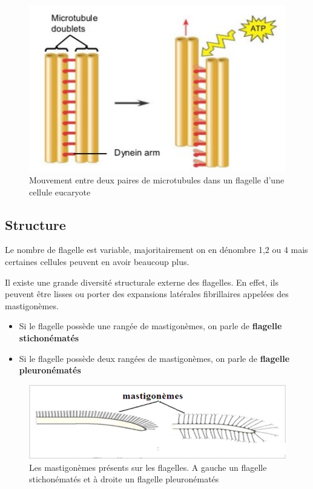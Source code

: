 \documentclass[
]{book}
\providecommand{\tightlist}{%
  \setlength{\itemsep}{0pt}\setlength{\parskip}{0pt}}
\begin{document}
\begin{figure}[H]

{\centering \includegraphics[width=5.67in]{images/mvt_microtubule} 

}

\caption{Mouvement entre deux paires de microtubules dans un flagelle d'une cellule eucaryote}\label{fig:microtubule}
\end{figure}

\hypertarget{structure}{%
\subsection{Structure}\label{structure}}

Le nombre de flagelle est variable, majoritairement on en dénombre 1,2 ou 4 mais certaines cellules peuvent en avoir beaucoup plus.

Il existe une grande diversité structurale externe des flagelles. En effet, ils peuvent être lisses ou porter des expansions latérales fibrillaires appelées des mastigonèmes.

\begin{itemize}
\tightlist
\item
  Si le flagelle possède une rangée de mastigonèmes, on parle de \textbf{flagelle stichonématés}
\item
  Si le flagelle possède deux rangées de mastigonèmes, on parle de \textbf{flagelle pleuronématés}
\end{itemize}

\begin{figure}[H]

{\centering \includegraphics[width=8.75in]{images/mastigonemes} 

}

\caption{Les mastigonèmes présents sur les flagelles. A gauche un flagelle stichonématés et à droite un flagelle pleuronématés}\label{fig:mastigonemes}
\end{figure}
\end{document}
